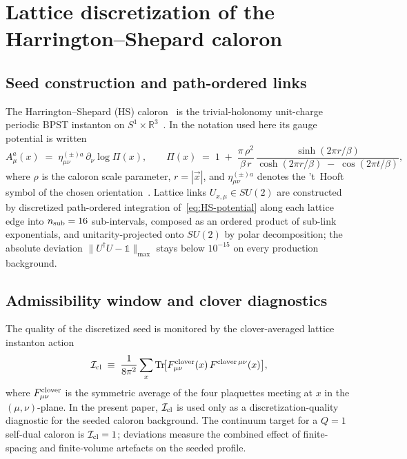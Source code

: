 \documentclass[a4paper,11pt]{article}
\theoremstyle{definition}
\newcommand{\Tr}{\mathop{\rm Tr}}
\newcommand{\Icl}{\mathcal{I}_{\rm cl}}
\newcommand{\bR}{\mathbb{R}}
\begin{document}
\section{Lattice discretization of the Harrington--Shepard caloron}
\label{sec:lattice-setup}

\subsection{Seed construction and path-ordered links}
\label{subsec:seed-construction}

The Harrington--Shepard (HS) caloron~\cite{HS1978} is the
trivial-holonomy unit-charge periodic BPST instanton on
$S^1 \times \bR^3$~\cite{BPST1975}. In the notation used here its
gauge potential is written
\begin{equation}
A_\mu^a(x)
\;=\;
\eta^{(\pm) a}_{\mu\nu}\,\partial_\nu \log\Pi(x),
\qquad
\Pi(x)
\;=\;
1 \;+\;
\frac{\pi\,\rho^2}{\beta\,r}\,
\frac{\sinh(2\pi r/\beta)}
     {\cosh(2\pi r/\beta) \;-\; \cos(2\pi t/\beta)},
\label{eq:HS-potential}
\end{equation}
where $\rho$ is the caloron scale parameter, $r = |\vec{x}|$, and
$\eta^{(\pm) a}_{\mu\nu}$ denotes the 't~Hooft symbol of the chosen
orientation~\cite{tHooft1976}. Lattice links $U_{x,\mu} \in SU(2)$
are constructed by discretized path-ordered integration
of~\eqref{eq:HS-potential} along each lattice edge into
$n_{\rm sub} = 16$ sub-intervals, composed as an ordered product of
sub-link exponentials, and unitarity-projected onto $SU(2)$ by polar
decomposition; the absolute deviation
$\|U^\dagger U - \mathbb{1}\|_{\max}$ stays below $10^{-15}$ on every
production background.

\subsection{Admissibility window and clover diagnostics}
\label{subsec:admissibility}

The quality of the discretized seed is monitored by the
clover-averaged lattice instanton action
\begin{equation}
\Icl
\;\equiv\;
\frac{1}{8\pi^2}\sum_x
\Tr\!\bigl[F^{\rm clover}_{\mu\nu}(x)\,F^{\rm clover\,\mu\nu}(x)\bigr],
\label{eq:Icl-def}
\end{equation}
where $F^{\rm clover}_{\mu\nu}$ is the symmetric average of the four
plaquettes meeting at $x$ in the $(\mu,\nu)$-plane. In the present
paper, $\Icl$ is used only as a discretization-quality diagnostic for
the seeded caloron background. The continuum target for a $Q = 1$
self-dual caloron is $\Icl = 1$; deviations measure the combined
effect of finite-spacing and finite-volume artefacts on the seeded
profile.
\end{document}

